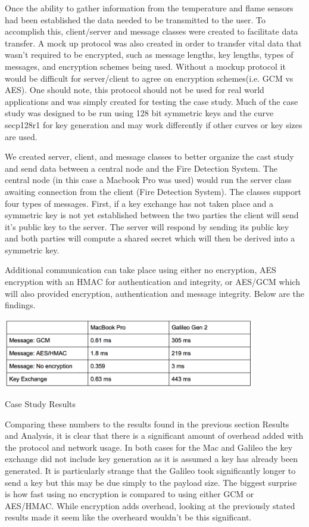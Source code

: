 Once the ability to gather information from the temperature and flame sensors had been established the data needed to be transmitted to the user. To accomplish this, client/server and message classes were created to facilitate data transfer. A mock up protocol was also created in order to transfer vital data that wasn't required to be encrypted, such as message lengths, key lengths, types of messages, and encryption schemes being used.  Without a mockup protocol it would be difficult for server/client to agree on encryption schemes(i.e. GCM vs AES). One should note, this protocol should not be used for real world applications and was simply created for testing the case study. Much of the case study was designed to be run using 128 bit symmetric keys and the curve secp128r1 for key generation and may work differently if other curves or key sizes are used.

We created server, client, and message classes to better organize the cast study and send data between a central node and the Fire Detection System. The central node (in this case a Macbook Pro was used)  would run the server class awaiting connection from the client (Fire Detection System). The classes support four types of messages. First, if a key exchange has not taken place and a symmetric key is not yet established between the two parties the client will send it's public key to the server. The server will respond by sending its public key and both parties will compute a shared secret which will then be derived into a symmetric key. 

Additional communication can take place using either no encryption, AES encryption with an HMAC for authentication and integrity, or AES/GCM which will also provided encryption, authentication and message integrity. Below are the findings. 


 \begin{table}[t]
	\centering
	\includegraphics[width=11cm,height=0.7\textheight,keepaspectratio]{./figures/table_4}
	\center\caption[font=footnote]{Case Study Results}
\end{table}

Comparing these numbers to the results found in the previous section Results and Analysis, it is clear that there is a significant amount of overhead added with the protocol and network usage. In both cases for the Mac and Galileo the key exchange did not include key generation as it is assumed a key has already been generated. It is particularly strange that the Galileo took significantly longer to send a key but this may be due simply to the payload size. The biggest surprise is how fast using no encryption is compared to using either GCM or AES/HMAC. While encryption adds overhead, looking at the previously stated results made it seem like the overheard wouldn't be this significant. 


